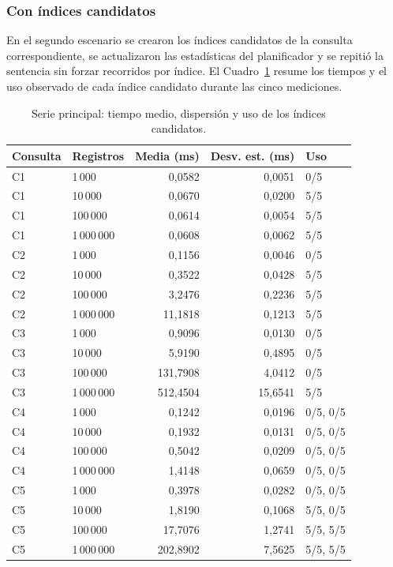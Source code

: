 \documentclass[12pt,a4paper]{article}
\begin{document}
\subsubsection{Con índices candidatos}
\label{sec:55-con-indices}

En el segundo escenario se crearon los índices candidatos de la
consulta correspondiente, se actualizaron las estadísticas del
planificador y se repitió la sentencia sin forzar recorridos por índice.
El Cuadro~\ref{tab:55-serie-con-indices} resume los tiempos y el uso
observado de cada índice candidato durante las cinco mediciones.

\begin{table}[H]
\centering\footnotesize
\setlength{\tabcolsep}{7pt}
\renewcommand{\arraystretch}{1.06}
\begin{tabular}{llrrl}
\toprule
\textbf{Consulta} & \textbf{Registros} & \textbf{Media (ms)} & \textbf{Desv. est. (ms)} & \textbf{Uso} \\
\midrule
C1 & 1\,000 & 0,0582 & 0,0051 & 0/5 \\
C1 & 10\,000 & 0,0670 & 0,0200 & 5/5 \\
C1 & 100\,000 & 0,0614 & 0,0054 & 5/5 \\
C1 & 1\,000\,000 & 0,0608 & 0,0062 & 5/5 \\
\midrule
C2 & 1\,000 & 0,1156 & 0,0046 & 0/5 \\
C2 & 10\,000 & 0,3522 & 0,0428 & 5/5 \\
C2 & 100\,000 & 3,2476 & 0,2236 & 5/5 \\
C2 & 1\,000\,000 & 11,1818 & 0,1213 & 5/5 \\
\midrule
C3 & 1\,000 & 0,9096 & 0,0130 & 0/5 \\
C3 & 10\,000 & 5,9190 & 0,4895 & 0/5 \\
C3 & 100\,000 & 131,7908 & 4,0412 & 0/5 \\
C3 & 1\,000\,000 & 512,4504 & 15,6541 & 5/5 \\
\midrule
C4 & 1\,000 & 0,1242 & 0,0196 & 0/5, 0/5 \\
C4 & 10\,000 & 0,1932 & 0,0131 & 0/5, 0/5 \\
C4 & 100\,000 & 0,5042 & 0,0209 & 0/5, 0/5 \\
C4 & 1\,000\,000 & 1,4148 & 0,0659 & 0/5, 0/5 \\
\midrule
C5 & 1\,000 & 0,3978 & 0,0282 & 0/5, 0/5 \\
C5 & 10\,000 & 1,8190 & 0,1068 & 5/5, 0/5 \\
C5 & 100\,000 & 17,7076 & 1,2741 & 5/5, 5/5 \\
C5 & 1\,000\,000 & 202,8902 & 7,5625 & 5/5, 5/5 \\
\bottomrule
\end{tabular}

\caption{Serie principal: tiempo medio, dispersión y uso de los índices candidatos.}
\label{tab:55-serie-con-indices}
\end{table}
\end{document}
